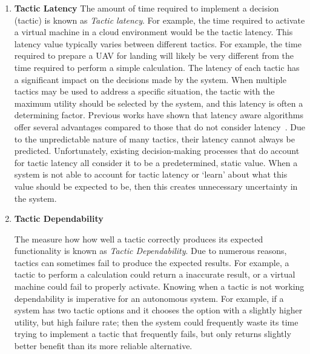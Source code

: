 \documentclass{article}
\begin{document}
\begin{enumerate}[noitemsep]
	\item \textbf{Tactic Latency} The amount of time required to implement a decision (tactic) is known as \emph{Tactic latency}. For example, the time required to activate a virtual machine in a cloud environment would be the tactic latency. This latency value typically varies between different tactics. For example, the time required to prepare a UAV for landing will likely be very different from the time required to perform a simple calculation. The latency of each tactic has a significant impact on the decisions made by the system. When multiple tactics may be used to address a specific situation, the tactic with the maximum utility should be selected by the system, and this latency is often a determining factor. Previous works have shown that latency aware algorithms offer several advantages compared to those that do not consider latency~\cite{camara2014stochastic, esfahani2013learning}. Due to the unpredictable nature of many tactics, their latency cannot always be predicted. Unfortunately, existing decision-making processes that do account for tactic latency all consider it to be a predetermined, static value. When a system is not able to account for tactic latency or `learn' about what this value should be expected to be, then this creates unnecessary uncertainty in the system.
    
    
	\item \textbf{Tactic Dependability} 

The measure how how well a tactic correctly produces its expected functionality is known as \emph{Tactic Dependability}. Due to numerous reasons, tactics can sometimes fail to produce the expected results. For example, a tactic to perform a calculation could return a inaccurate result, or a virtual machine could fail to properly activate. Knowing when a tactic is not working dependability is imperative for an autonomous system. For example, if a system has two tactic options and it chooses the option with a slightly higher utility, but high failure rate; then the system could frequently waste its time trying to implement a tactic that frequently fails, but only returns slightly better benefit than its more reliable alternative.








\end{enumerate}
\end{document}
